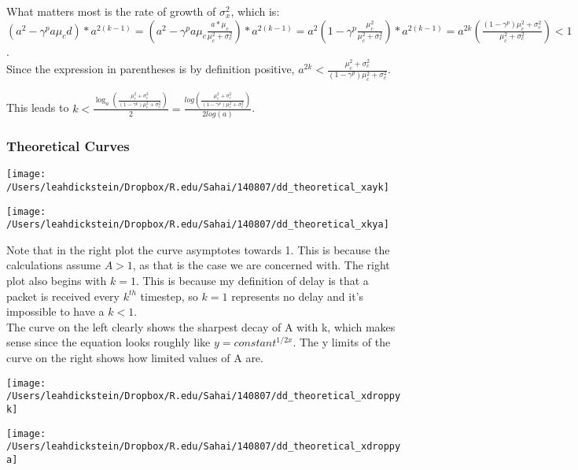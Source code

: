 \documentclass[leqno,twocolumn]{article}
\begin{document}
What matters most is the rate of growth of $\sigma_x^2$, which is:\\
$(a^2 -\gamma^p a\mu_c d) * a^{2(k-1)} = (a^2 -\gamma^p a\mu_c \frac{a*\mu_c}{\mu_c^2+\sigma_c^2}) * a^{2(k-1)} = a^2\left(1 -\gamma^p \frac{\mu_c^2}{\mu_c^2+\sigma_c^2}\right) * a^{2(k-1)} = a^{2k} \left(\frac{(1-\gamma^p)\mu_c^2 +\sigma_c^2}{\mu_c^2+\sigma_c^2}\right) < 1$.\\

Since the expression in parentheses is by definition positive, $\boxed{a^{2k} < \frac{\mu_c^2+\sigma_c^2}{(1-\gamma^p)\mu_c^2+\sigma_c^2}}$.

\begin{center}This leads to $\boxed{k < \frac{\log_a\left(\frac{\mu_c^2+\sigma_c^2}{(1-\gamma^p)\mu_c^2+\sigma_c^2}\right)}{2} = \frac{log\left(\frac{\mu_c^2+\sigma_c^2}{(1-\gamma^p)\mu_c^2+\sigma_c^2}\right)}{2log(a)}}$.\end{center}

\subsubsection{Theoretical Curves}

\begin{minipage}[c]{0.5\textwidth}
\texttt{[image: /Users/leahdickstein/Dropbox/R.edu/Sahai/140807/dd\_theoretical\_xayk]}
\end{minipage}
\begin{minipage}[c]{0.5\textwidth}
\texttt{[image: /Users/leahdickstein/Dropbox/R.edu/Sahai/140807/dd\_theoretical\_xkya]}
\end{minipage}

Note that in the right plot the curve asymptotes towards 1. This is because the calculations assume $A > 1$, as that is the case we are concerned with. The right plot also begins with $k = 1$. This is because my definition of delay is that a packet is received every $k^{th}$ timestep, so $k=1$ represents no delay and it's impossible to have a $k < 1$.\\
The curve on the left clearly shows the sharpest decay of A with k, which makes sense since the equation looks roughly like $y = constant^{1/2x}$. The y limits of the curve on the right shows how limited values of A are.

\begin{minipage}[c]{0.5\textwidth}
\texttt{[image: /Users/leahdickstein/Dropbox/R.edu/Sahai/140807/dd\_theoretical\_xdroppyk]}
\end{minipage}
\begin{minipage}[c]{0.5\textwidth}
\texttt{[image: /Users/leahdickstein/Dropbox/R.edu/Sahai/140807/dd\_theoretical\_xdroppya]}
\end{minipage}
\end{document}
